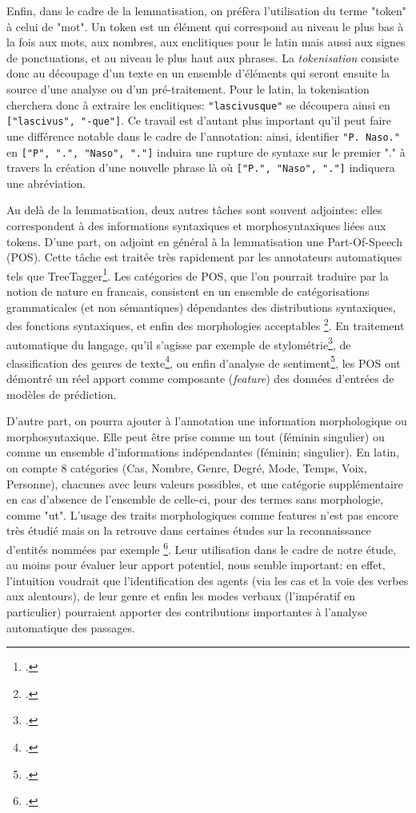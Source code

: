 Enfin, dans le cadre de la lemmatisation, on préfèra l'utilisation du terme "token" à celui de "mot". Un token est un élément qui correspond au niveau le plus bas à la fois aux mots, aux nombres, aux enclitiques pour le latin mais aussi aux signes de ponctuations, et au niveau le plus haut aux phrases. La \textit{tokenisation} consiste donc au découpage d'un texte en un ensemble d'éléments qui seront ensuite la source d'une analyse ou d'un pré-traitement. Pour le latin, la tokenisation cherchera donc à extraire les enclitiques: \texttt{"lascivusque"} se découpera ainsi en \texttt{["lascivus", "-que"]}. Ce travail est d'autant plus important qu'il peut faire une différence notable dans le cadre de l'annotation: ainsi, identifier \texttt{"P. Naso."} en \texttt{["P", ".", "Naso", "."]} induira une rupture de syntaxe sur le premier "." à travers la création d'une nouvelle phrase là où \texttt{["P.", "Naso", "."]} indiquera une abréviation.

Au delà de la lemmatisation, deux autres tâches sont souvent adjointes: elles correspondent à des informations syntaxiques et morphosyntaxiques liées aux tokens. D'une part, on adjoint en général à la lemmatisation une Part-Of-Speech (POS). Cette tâche est traitée très rapidement par les annotateurs automatiques tels que TreeTagger\footcite{schmid1994treetagger}. Les catégories de POS, que l'on pourrait traduire par la notion de nature en francais, consistent en un ensemble de catégorisations grammaticales (et non sémantiques) dépendantes des distributions syntaxiques, des fonctions syntaxiques, et enfin des morphologies acceptables \footcite{schachter1985parts}. En traitement automatique du langage, qu'il s'agisse par exemple de stylométrie\footcite{Cafieroeaax5489}, de classification des genres de texte\footcite{feldman2009part}, ou enfin d'analyse de sentiment\footcite{wang2015pos}, les POS ont démontré un réel apport comme composante (\textit{feature}) des données d'entrées de modèles de prédiction.

D'autre part, on pourra ajouter à l'annotation une information morphologique ou morphosyntaxique. Elle peut être prise comme un tout (féminin singulier) ou comme un ensemble d'informations indépendantes (féminin; singulier). En latin, on compte 8 catégories (Cas, Nombre, Genre, Degré, Mode, Temps, Voix, Personne), chacunes avec leurs valeurs possibles, et une catégorie supplémentaire en cas d'absence de l'ensemble de celle-ci, pour des termes sans morphologie, comme "ut". L'usage des traits morphologiques comme features n'est pas encore très étudié %
mais on la retrouve dans certaines études sur la reconnaissance d'entités nommées par exemple \footcite[Par exemple]{zirikly2014named}. Leur utilisation dans le cadre de notre étude, au moins pour évaluer leur apport potentiel, nous semble important: en effet, l'intuition voudrait que l'identification des agents (via les cas et la voie des verbes aux alentours), de leur genre et enfin les modes verbaux (l'impératif en particulier) pourraient apporter des contributions importantes à l'analyse automatique des passages.



